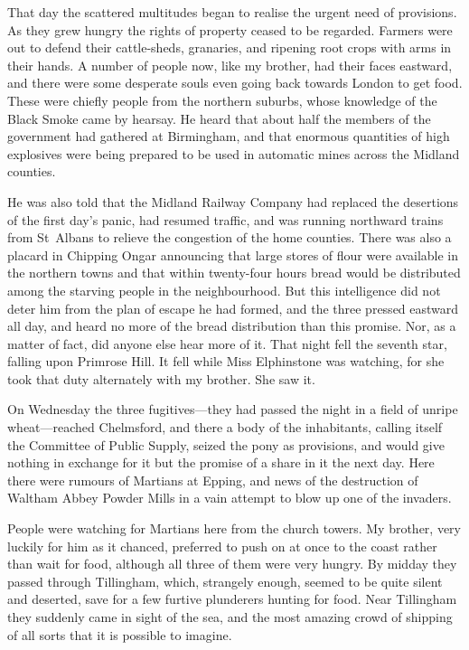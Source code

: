 That day the scattered multitudes began to realise the urgent need of provisions. As they grew hungry the rights of property ceased to be regarded. Farmers were out to defend their cattle-sheds, granaries, and ripening root crops with arms in their hands. A number of people now, like my brother, had their faces eastward, and there were some desperate souls even going back towards London to get food. These were chiefly people from the northern suburbs, whose knowledge of the Black Smoke came by hearsay. He heard that about half the members of the government had gathered at Birmingham, and that enormous quantities of high explosives were being prepared to be used in automatic mines across the Midland counties.

He was also told that the Midland Railway Company had replaced the desertions of the first day's panic, had resumed traffic, and was running northward trains from St~Albans to relieve the congestion of the home counties. There was also a placard in Chipping Ongar announcing that large stores of flour were available in the northern towns and that within twenty-four hours bread would be distributed among the starving people in the neighbourhood. But this intelligence did not deter him from the plan of escape he had formed, and the three pressed eastward all day, and heard no more of the bread distribution than this promise. Nor, as a matter of fact, did anyone else hear more of it. That night fell the seventh star, falling upon Primrose Hill. It fell while Miss Elphinstone was watching, for she took that duty alternately with my brother. She saw it.

On Wednesday the three fugitives—they had passed the night in a field of unripe wheat—reached Chelmsford, and there a body of the inhabitants, calling itself the Committee of Public Supply, seized the pony as provisions, and would give nothing in exchange for it but the promise of a share in it the next day. Here there were rumours of Martians at Epping, and news of the destruction of Waltham Abbey Powder Mills in a vain attempt to blow up one of the invaders.

People were watching for Martians here from the church towers. My brother, very luckily for him as it chanced, preferred to push on at once to the coast rather than wait for food, although all three of them were very hungry. By midday they passed through Tillingham, which, strangely enough, seemed to be quite silent and deserted, save for a few furtive plunderers hunting for food. Near Tillingham they suddenly came in sight of the sea, and the most amazing crowd of shipping of all sorts that it is possible to imagine.

